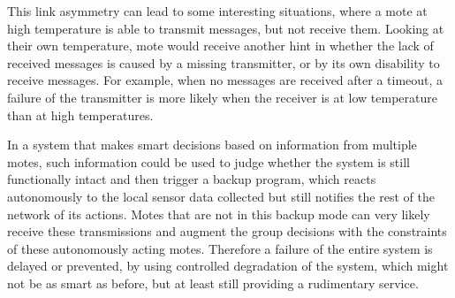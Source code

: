 This link asymmetry can lead to some interesting situations, where a mote at high temperature is able to transmit messages, but not receive them.
Looking at their own temperature, mote would receive another hint in whether the lack of received messages is caused by a missing transmitter, or by its own disability to receive messages.
For example, when no messages are received after a timeout, a failure of the transmitter is more likely when the receiver is at low temperature than at high temperatures.

In a system that makes smart decisions based on information from multiple motes, such information could be used to judge whether the system is still functionally intact and then trigger a backup program, which reacts autonomously to the local sensor data collected but still notifies the rest of the network of its actions.
Motes that are not in this backup mode can very likely receive these transmissions and augment the group decisions with the constraints of these autonomously acting motes.
Therefore a failure of the entire system is delayed or prevented, by using controlled degradation of the system, which might not be as smart as before, but at least still providing a rudimentary service.
































